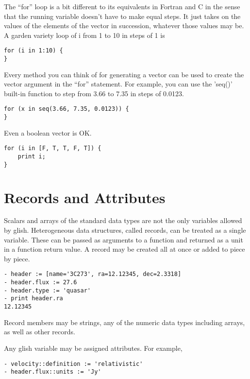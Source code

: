 The ``for'' loop is a bit different to its equivalents in Fortran and C in
the sense that the running variable doesn't have to make equal steps.  It
just takes on the values of the elements of the vector in succession,
whatever those values may be.  A garden variety loop of i from 1 to 10 in
steps of 1 is

\begin{verbatim}
for (i in 1:10) {
}
\end{verbatim}

Every method you can think of for generating a vector can be used to create
the vector argument in the ``for'' statement.  For example, you can use the
'seq()' built-in function to step from 3.66 to 7.35 in steps of 0.0123.

\begin{verbatim}
for (x in seq(3.66, 7.35, 0.0123)) {
}
\end{verbatim}

Even a boolean vector is OK.

\begin{verbatim}
for (i in [F, T, T, F, T]) {
    print i;
}
\end{verbatim}

\section{Records and Attributes}

    Scalars and arrays of the standard data types are not the only
variables allowed by glish.  Heterogeneous data structures, called records,
can be treated as a single variable.  These can be passed as arguments to a
function and returned as a unit in a function return value.  A record may be
created all at once or added to piece by piece.

\begin{verbatim}
- header := [name='3C273', ra=12.12345, dec=2.3318]
- header.flux := 27.6
- header.type := 'quasar'
- print header.ra
12.12345
\end{verbatim}

    Record members may be strings, any of the numeric data types
including arrays, as well as other records.

    Any glish variable may be assigned attributes.  For example,

\begin{verbatim}
- velocity::definition := 'relativistic'
- header.flux::units := 'Jy'
\end{verbatim}

